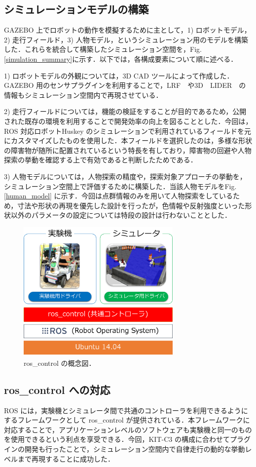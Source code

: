 \documentclass[10pt,a4paper]{jarticle}
\begin{document}
\subsection{シミュレーションモデルの構築}
\label{subsec:simulationmodel}
GAZEBO 上でロボットの動作を模擬するために主として，1) ロボットモデル，2) 走行フィールド，3) 人物モデル，というシミュレーション用のモデルを構築した．これらを統合して構築したシミュレーション空間を，Fig.\ref{simulation_summary}に示す．以下では，各構成要素について順に述べる．

1) ロボットモデルの外観については，3D CAD ツールによって作成した．GAZEBO 用のセンサプラグインを利用することで，LRF　や3D　LIDER　の情報もシミュレーション空間内で再現させている．

2) 走行フィールドについては，機能の検証をすることが目的であるため，公開された既存の環境を利用することで開発効率の向上を図ることとした．今回は，ROS 対応ロボットHuskey \cite{husky} のシミュレーションで利用されているフィールドを元にカスタマイズしたものを使用した．本フィールドを選択したのは，多様な形状の障害物が随所に配置されているという特長を有しており，障害物の回避や人物探索の挙動を確認する上で有効であると判断したためである．

3) 人物モデルについては，人物探索の精度や，探索対象アプローチの挙動を，シミュレーション空間上で評価するために構築した．当該人物モデルをFig. \ref{human_model} に示す．今回は点群情報のみを用いて人物探索をしているため，寸法や形状の再現を優先した設計を行ったが，色情報や反射強度といった形状以外のパラメータの設定については特段の設計は行わないこととした．

\begin{figure}[ht]
    \centering
    \includegraphics[width=8cm]{./fig/png/ros_control.png}
    \caption{ros\_control の概念図．}
    \label{ros_control}
\end{figure}

\subsection{ros\_control への対応}
\label{subsec:ros_control}
ROS には，実験機とシミュレータ間で共通のコントローラを利用できるようにするフレームワークとして ros\_control が提供されている．本フレームワークに対応することで，アプリケーションレベルのソフトウェアも実験機と同一のものを使用できるという利点を享受できる．今回，KIT-C3 の構成に合わせてプラグインの開発も行ったことで，シミュレーション空間内で自律走行の動的な挙動レベルまで再現することに成功した．
\end{document}
